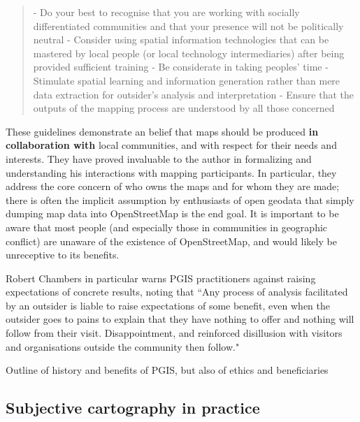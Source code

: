 \documentclass[11pt]{report}
\begin{document}
\begin{quote}
- Do your best to recognise that you are working with socially differentiated communities and that your presence will not be politically neutral
- Consider using spatial information technologies that can be mastered by local people (or local technology intermediaries) after being provided sufficient training
- Be considerate in taking peoples' time
- Stimulate spatial learning and information generation rather than mere data extraction for outsider’s analysis and interpretation
- Ensure that the outputs of the mapping process are understood by all those concerned
\cite{rambaldi2006practical}
\end{quote}

These guidelines demonstrate an belief that maps should be produced \textbf{in collaboration with} local communities, and with respect for their needs and interests. They have proved invaluable to the author in formalizing and understanding his interactions with mapping participants. In particular, they address the core concern of who owns the maps and for whom they are made; there is often the implicit assumption by enthusiasts of open geodata that simply dumping map data into OpenStreetMap is the end goal. It is important to be aware that most people (and especially those in communities in geographic conflict) are unaware of the existence of OpenStreetMap, and would likely be unreceptive to its benefits. 

Robert Chambers in particular warns PGIS practitioners against raising expectations of concrete results, noting that ``Any process of analysis facilitated by an outsider is liable to raise expectations of some benefit, even when the outsider goes to pains to explain that they have nothing to offer and nothing will follow from their visit. Disappointment, and reinforced disillusion with visitors and organisations outside the community then follow."




Outline of history and benefits of PGIS, but also of ethics and beneficiaries

\subsection{Subjective cartography in practice}
\end{document}
